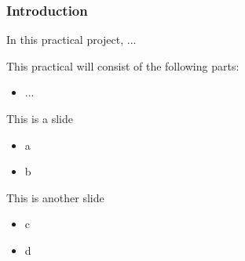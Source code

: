 \documentclass[9pt]{beamer-control}
\begin{document}

\begin{frame}
\frametitle{Introduction}
In this practical project, ...

\vfill

This practical will consist of the following parts:
\begin{itemize}
\item ...
\end{itemize}
\end{frame}


\begin{frame}{This is a slide}
\begin{itemize}
\item a
\item b
\end{itemize}
\end{frame}



\begin{frame}{This is another slide}
\begin{itemize}
\item c
\item d
\end{itemize}
\end{frame}


\SUMMARYFRAME
\end{document}
